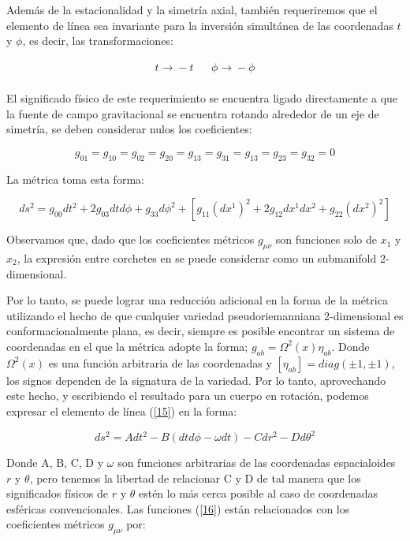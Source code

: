 \documentclass{article}
\begin{document}
Además de la estacionalidad y la simetría axial, también requeriremos que el elemento de línea sea invariante para la inversión simultánea de las coordenadas $t$ y $\phi$, es decir, las transformaciones:\cite{jeffersonagujeros}

\begin{align*}
    t \xrightarrow[]{} -t && \phi \xrightarrow[]{} -\phi
\end{align*}

El significado físico de este requerimiento se encuentra ligado directamente a que la fuente de campo gravitacional se encuentra rotando alrededor de un eje de simetría, se deben considerar nulos los coeficientes:\cite{jeffersonagujeros}

\begin{equation}
    g_{01}=g_{10}=g_{02}=g_{20}=g_{13}=g_{31}=g_{13}=g_{23}=g_{32}=0
\end{equation}

La métrica toma esta forma:

\begin{equation}\label{15}
    ds^{2}=
    g_{00}dt^{2} 
    +2g_{03}dtd\phi 
    +g_{33}d\phi^{2}
    +\left[g_{11}(dx^{1})^{2}+2g_{12}dx^{1}dx^{2}+g_{22}(dx^{2})^{2}
    \right]
\end{equation}


Observamos que, dado que los coeficientes métricos $g_{\mu\nu}$ son funciones solo de $x_{1}$ y $x_{2}$, la expresión entre corchetes en se puede considerar como un submanifold 2-dimensional.\cite{jeffersonagujeros}

Por lo tanto, se puede lograr una reducción adicional en la forma de la métrica utilizando el hecho de que cualquier variedad pseudoriemanniana 2-dimensional es conformacionalmente plana, es decir, siempre es posible encontrar un sistema de coordenadas en el que la métrica adopte la forma; $g_{ab}=\Omega^{2}(x)\eta_{ab}$. Donde $\Omega^{2}(x)$ es una función arbitraria de las coordenadas y $[\eta_{ab}] = diag(\pm1, \pm1)$, los signos dependen de la signatura de la variedad. Por lo tanto, aprovechando este hecho, y escribiendo el resultado para un cuerpo en rotación, podemos expresar el elemento de línea (\ref{15}) en la forma:\cite{jeffersonagujeros}

\begin{equation}\label{16}
    ds^{2}=
    Adt^{2} 
    -B(dtd\phi -\omega dt)
    -Cdr^{2}
    -Dd\theta^{2}
\end{equation}

Donde A, B, C, D y $\omega$ son funciones arbitrarias de las coordenadas espacialoides $r$ y $\theta$, pero tenemos la libertad de relacionar C y D de tal manera que los significados físicos
de $r$ y $\theta$ estén lo más cerca posible al caso de coordenadas esféricas convencionales. Las funciones (\ref{16}) están relacionados con los coeficientes métricos $g_{\mu\nu}$ por:\cite{jeffersonagujeros}
\end{document}
